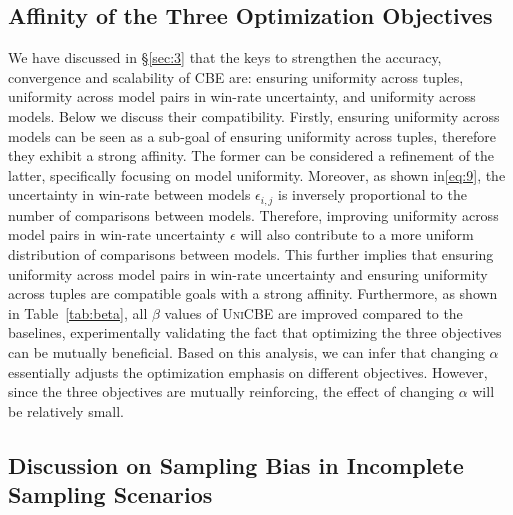 \subsection{Affinity of the Three Optimization Objectives}
\label{app:dis-aff}
We have discussed in \S\ref{sec:3} that the keys to strengthen the accuracy, convergence and scalability of CBE are: ensuring uniformity across tuples, uniformity across model pairs in win-rate uncertainty, and uniformity across models.
Below we discuss their compatibility. Firstly, ensuring uniformity across models can be seen as a sub-goal of ensuring uniformity across tuples, therefore they exhibit a strong affinity. The former can be considered a refinement of the latter, specifically focusing on model uniformity. 
Moreover, as shown in\eqref{eq:9}, the uncertainty in win-rate between models $\epsilon_{i,j}$ is inversely proportional to the number of comparisons between models. Therefore, improving uniformity across model pairs in win-rate uncertainty $\epsilon$ will also contribute to a more uniform distribution of comparisons between models. This further implies that ensuring uniformity across model pairs in win-rate uncertainty and ensuring uniformity across tuples are compatible goals with a strong affinity.
Furthermore, as shown in Table~\ref{tab:beta}, all $\beta$ values of \textsc{UniCBE} are improved compared to the baselines, experimentally validating the fact that optimizing the three objectives can be mutually beneficial. Based on this analysis, we can infer that changing $\alpha$ essentially adjusts the optimization emphasis on different objectives. However, since the three objectives are mutually reinforcing, the effect of changing $\alpha$ will be relatively small.

\subsection{Discussion on Sampling Bias in Incomplete Sampling Scenarios}

